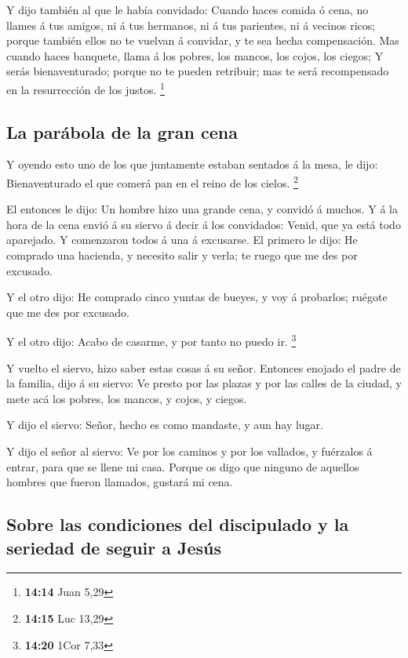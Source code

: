  Y dijo también al que le había convidado: Cuando haces
comida ó cena, no llames á tus amigos, ni á tus hermanos, ni á tus
parientes, ni á vecinos ricos; porque también ellos no te vuelvan á
convidar, y te sea hecha compensación.  Mas cuando haces
banquete, llama á los pobres, los mancos, los cojos, los ciegos;
 Y serás bienaventurado; porque no te pueden retribuir;
mas te será recompensado en la resurrección de los justos. \footnote{\textbf{14:14}
  Juan 5,29}

\hypertarget{la-paruxe1bola-de-la-gran-cena}{%
\subsection{La parábola de la gran
cena}\label{la-paruxe1bola-de-la-gran-cena}}

 Y oyendo esto uno de los que juntamente estaban sentados
á la mesa, le dijo: Bienaventurado el que comerá pan en el reino de los
cielos. \footnote{\textbf{14:15} Luc 13,29}

 El entonces le dijo: Un hombre hizo una grande cena, y
convidó á muchos.  Y á la hora de la cena envió á su
siervo á decir á los convidados: Venid, que ya está todo aparejado.
 Y comenzaron todos á una á excusarse. El primero le
dijo: He comprado una hacienda, y necesito salir y verla; te ruego que
me des por excusado.

 Y el otro dijo: He comprado cinco yuntas de bueyes, y
voy á probarlos; ruégote que me des por excusado.

 Y el otro dijo: Acabo de casarme, y por tanto no puedo
ir. \footnote{\textbf{14:20} 1Cor 7,33}

 Y vuelto el siervo, hizo saber estas cosas á su señor.
Entonces enojado el padre de la familia, dijo á su siervo: Ve presto por
las plazas y por las calles de la ciudad, y mete acá los pobres, los
mancos, y cojos, y ciegos.

 Y dijo el siervo: Señor, hecho es como mandaste, y aun
hay lugar.

 Y dijo el señor al siervo: Ve por los caminos y por los
vallados, y fuérzalos á entrar, para que se llene mi casa.
 Porque os digo que ninguno de aquellos hombres que
fueron llamados, gustará mi cena.

\hypertarget{sobre-las-condiciones-del-discipulado-y-la-seriedad-de-seguir-a-jesuxfas}{%
\subsection{Sobre las condiciones del discipulado y la seriedad de
seguir a
Jesús}\label{sobre-las-condiciones-del-discipulado-y-la-seriedad-de-seguir-a-jesuxfas}}

